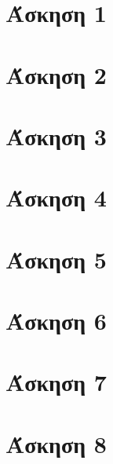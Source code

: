 \documentclass[a4paper,12pt]{article}
\numberwithin{figure}{section}
\numberwithin{table}{section}
\begin{document}

\tableofcontents
\newpage

\section{Άσκηση 1}

\newpage

\section{Άσκηση 2}

\newpage

\section{Άσκηση 3}

\newpage

\section{Άσκηση 4}

\newpage

\section{Άσκηση 5}

\newpage

\section{Άσκηση 6}

\newpage

\section{Άσκηση 7}

\newpage

\section{Άσκηση 8}

\newpage
\end{document}

